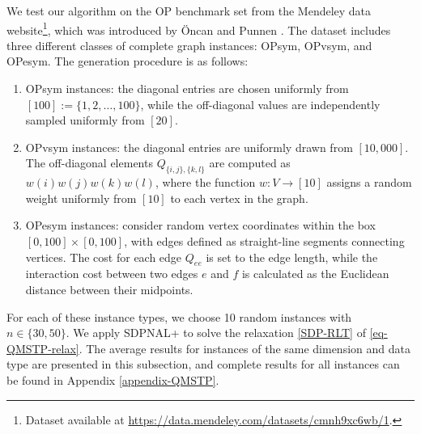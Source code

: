\documentclass[11pt]{article}
\theoremstyle{plain}
\begin{document}
We test our algorithm on the OP benchmark set from the Mendeley data website\footnote{Dataset available at \url{https://data.mendeley.com/datasets/cmnh9xc6wb/1}.}, which was introduced by \"Oncan and Punnen \cite{oncan2010quadratic}. The dataset includes three different classes of complete graph instances: OPsym, OPvsym, and OPesym. The generation procedure is as follows:
\begin{enumerate}
    \item OPsym instances: the diagonal entries are chosen uniformly from $[100] := \{1,2,\ldots,100\}$, while the off-diagonal values are independently sampled uniformly from $[20]$.
    \item OPvsym instances: the diagonal entries are uniformly drawn from $[10,000]$. The off-diagonal elements $Q_{\{i,j\},\{k,l\}}$ are computed as $w(i) w(j) w(k) w(l)$, where the function $w \colon V \to [10]$ assigns a random weight uniformly from $[10]$ to each vertex in the graph.
    \item OPesym instances: consider random vertex coordinates within the box $[0,100] \times [0,100]$, with edges defined as straight-line segments connecting vertices. The cost for each edge $Q_{ee}$ is set to the edge length, while the interaction cost between two edges $e$ and $f$ is calculated as the Euclidean distance between their midpoints.
\end{enumerate}
For each of these instance types, we choose 10 random instances with $n \in \{30, 50\}$. We apply SDPNAL+ to solve the relaxation \eqref{SDP-RLT} of \eqref{eq-QMSTP-relax}. 
The average results for instances of the same dimension and data type are presented in this subsection, and complete results for all instances can be found in Appendix \ref{appendix-QMSTP}.
\end{document}
